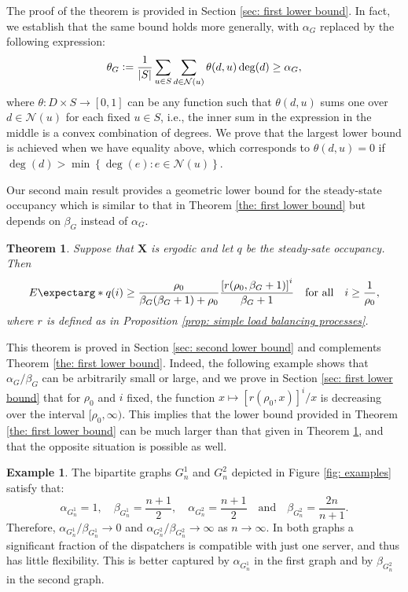 \documentclass[a4paper, 12pt]{article}
\newtheorem{theorem}{Theorem}
\theoremstyle{definition}
\newtheorem{example}{Example}
\newcommand{\map}[3]{#1 : #2 \longrightarrow #3}
\newcommand{\set}[2]{\left\{#1 : #2\right\}}
\newcommand{\defeq}{\vcentcolon=}
\newcommand{\bX}{\boldsymbol{X}}
\newcommand{\calN}{\mathcal{N}}
\newcommand{\expect}{E\expectarg}
\begin{document}
The proof of the theorem is provided in Section \ref{sec: first lower bound}. In fact, we establish that the same bound holds more generally, with $\alpha_G$ replaced by the following expression:
\begin{equation*}
	\theta_G \defeq \frac{1}{|S|}\sum_{u \in S} \sum_{d \in \calN(u)} \theta(d, u) \deg(d) \geq \alpha_G,
\end{equation*}
where $\map{\theta}{D \times S}{[0, 1]}$ can be any function such that $\theta(d, u)$ sums one over $d \in \calN(u)$ for each fixed $u \in S$, i.e., the inner sum in the expression in the middle is a convex combination of degrees. We prove that the largest lower bound is achieved when we have equality above, which corresponds to $\theta(d, u) = 0$ if $\deg(d) > \min \set{\deg(e)}{e \in \calN(u)}$.

Our second main result provides a geometric lower bound for the steady-state occupancy which is similar to that in Theorem \ref{the: first lower bound} but depends on $\beta_G$ instead of $\alpha_G$.

\begin{theorem}
	\label{the: second lower bound}
	Suppose that $\bX$ is ergodic and let $q$ be the steady-sate occupancy. Then
	\begin{equation*}
		\expect*{q(i)} \geq \frac{\rho_0}{\beta_G(\beta_G + 1) + \rho_0} \frac{\left[r(\rho_0, \beta_G + 1)\right]^i}{\beta_G + 1} \quad \text{for all} \quad i \geq \frac{1}{\rho_0},
	\end{equation*}
	where $r$ is defined as in Proposition \ref{prop: simple load balancing processes}.
\end{theorem}

This theorem is proved in Section \ref{sec: second lower bound} and complements Theorem \ref{the: first lower bound}. Indeed, the following example shows that $\alpha_G / \beta_G$ can be arbitrarily small or large, and we prove in Section \ref{sec: first lower bound} that for $\rho_0$ and $i$ fixed, the function $x \mapsto [r(\rho_0, x)]^i / x$ is decreasing over the interval $[\rho_0, \infty)$. This implies that the lower bound provided in Theorem \ref{the: first lower bound} can be much larger than that given in Theorem \ref{the: second lower bound}, and that the opposite situation is possible as well.

\begin{example}
	\label{ex: flexibility metrics} The bipartite graphs $G_n^1$ and $G_n^2$ depicted in Figure \ref{fig: examples} satisfy that:
	\begin{equation*}
		\alpha_{G_n^1} = 1, \quad \beta_{G_n^1} = \frac{n + 1}{2}, \quad \alpha_{G_n^2} = \frac{n + 1}{2} \quad \text{and} \quad \beta_{G_n^2} = \frac{2n}{n + 1}. 
	\end{equation*}
	Therefore, $\alpha_{G_n^1} / \beta_{G_n^1} \to 0$ and $\alpha_{G_n^2} / \beta_{G_n^2} \to \infty$ as $n \to \infty$. In both graphs a significant fraction of the dispatchers is compatible with just one server, and thus has little flexibility. This is better captured by $\alpha_{G_n^1}$ in the first graph and by $\beta_{G_n^2}$ in the second graph.
\end{example}
\end{document}
